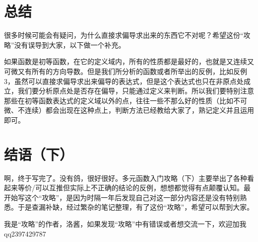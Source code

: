 \documentclass{article}
\begin{document}
\newpage

\section{总结}
很多时候可能会有疑问，为什么直接求偏导求出来的东西它不对呢？希望这份“攻略”没有误导到大家，以下做一个补充。

如果函数是初等函数，在它的定义域内，所有的性质都是最好的，也就是又连续又可微又有所有的方向导数。但是我们所分析的函数或者所举出的反例，比如反例3，虽然可以直接求偏导求出来偏导的表达式，但是这个表达式也只在非原点处成立，我们要分析原点处是否存在偏导，只能通过定义来判断。所以我们要特别注意那些在初等函数表达式的定义域以外的点，往往一些不那么好的性质（比如不可微、不连续）都会出现在这种点上，判断方法已经教给大家了，熟记定义并且运用即可。


\section{结语（下）}
啊，终于写完了。没有鸽，很好很好。多元函数入门攻略（下）主要举出了各种看起来等价/可以互推但实际上不正确的结论的反例，想想都觉得有点颠覆认知。最开始写这个“攻略”，是因为时隔一年后发现自己对这一部分内容还是没有特别熟悉。于是查漏补缺，经过繁杂的笔记整理，有了这份“攻略”，希望可以帮到大家。

我是“攻略”的作者，洛酱，如果发现“攻略”中有错误或者想交流一下，欢迎加我qq2397429787
\end{document}
